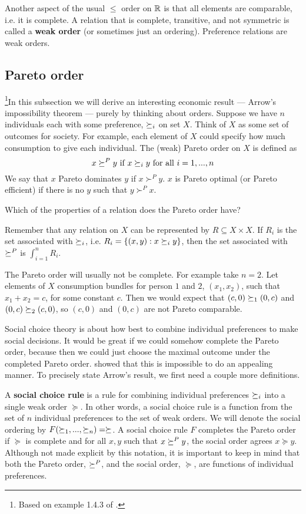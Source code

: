 Another aspect of the usual $\leq$ order on $\mathbb{R}$ is that all elements
are comparable, i.e. it is complete. A relation that is complete,
transitive, and not symmetric is called a \textbf{weak order} (or
sometimes just an ordering). Preference relations are weak orders. 

\subsection{Pareto order}

\footnote{Based on example 1.4.3 of \cite{carter2001}.}In this
subsection we will derive an interesting economic result --- Arrow's
impossibility theorem --- purely by thinking about orders.  Suppose we
have $n$ individuals each with some preference, $\succeq_i$ on set
$X$. Think of $X$ as some set of outcomes for society. For example,
each element of $X$ could specify how much consumption to give each
individual. The (weak) Pareto order on $X$ is defined as
\[ x \succeq^P y \text{ if } x \succeq_i y \text{ for all } i=1,...,n \]
We say that $x$ Pareto dominates $y$ if $x \succ^P y$. $x$ is Pareto
optimal (or Pareto efficient) if there is no $y$ such that $y \succ^P
x$. 
\begin{exercise}
  Which of the properties of a relation does the Pareto order have?
\end{exercise}
Remember that any relation on $X$ can be represented by $R \subseteq X
\times X$. If $R_i$ is the set associated with $\succeq_i$, i.e. $R_i =
\{(x,y): x \succeq_i y \}$, then the set associated with $\succeq^P$ is
$\int_{i=1}^n R_i$. 

The Pareto order will usually not be complete. For example take
$n=2$.  Let elements of $X$ consumption bundles for person $1$ and
$2$, $(x_1,x_2)$, such that $x_1 + x_2 = c$, for some constant
$c$. Then we would expect that $(c,0) \succeq_1 (0,c)$ and $(0,c)
\succeq_2 (c,0)$, so $(c,0)$ and $(0,c)$ are not Pareto comparable. 

Social choice theory is about how best to combine individual
preferences to make social decisions.  It would be great if we could
somehow complete the Pareto order, because then we could just choose
the maximal outcome under the completed Pareto order.
\cite{arrow1950} showed that this is impossible to do an appealing
manner. To precisely state Arrow's result, we first need a couple more
definitions. 

A \textbf{social choice rule} is a rule for combining individual
preferences $\succeq_i$ into a single weak order $\succeq$. In other
words, a social choice rule is a function from the set of $n$ individual
preferences to the set of weak orders. We will denote the social
ordering by $F(\succeq_1, ..., \succeq_n) = \succeq$. A social choice rule
$F$ completes the Pareto order if $\succeq$ is complete and for
all $x,y$ such that $x \succeq^P y$, the social order agrees $x \succeq
y$. Although not made explicit by this notation, it is important to
keep in mind that both the Pareto order, $\succeq^P$, and the social
order, $\succeq$, are functions of individual preferences. 


